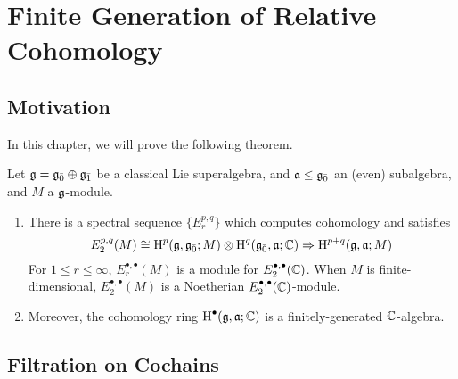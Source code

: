 \chapter{Finite Generation of Relative Cohomology}
\label{ch:finite-generation}


\section{Motivation}

In this chapter, we will prove the following theorem.

\begin{theorem}
  \label{thm:fg}
  Let $\mathfrak{g} = {\mathfrak{g}}_{\bar{0}} \oplus {\mathfrak{g}}_{\bar{1}}$ be a classical Lie superalgebra, and $\mathfrak{a} \leq {\mathfrak{g}}_{\bar{0}}$ an (even) subalgebra, and $M$ a $\mathfrak{g}$-module.
  \begin{enumerate}[\indent\rm (a)]
    \item There is a spectral sequence $\{E_r^{p,q}\}$ which computes cohomology and satisfies
  \[
    E_2^{p,q}(M) \cong \operatorname{H}^p(\mathfrak{g},{\mathfrak{g}}_{\bar{0}};M) \otimes \operatorname{H}^q({\mathfrak{g}}_{\bar{0}},\mathfrak{a};\mathbb{C}) \Rightarrow \operatorname{H}^{p+q}(\mathfrak{g},\mathfrak{a};M)
  \]
  For $1 \leq r \leq \infty$, $E_r^{\bullet,\bullet}(M)$ is a module for $E_2^{\bullet,\bullet}(\mathbb{C})$. When $M$ is finite-dimensional, $E_2^{\bullet,\bullet}(M)$ is a Noetherian $E_2^{\bullet,\bullet}(\mathbb{C})$-module.
    \item Moreover, the cohomology ring $\operatorname{H}^\bullet(\mathfrak{g},\mathfrak{a};\mathbb{C})$ is a finitely-generated $\mathbb{C}$-algebra.
  \end{enumerate}
\end{theorem}

\section{Filtration on Cochains}
\label{sec:filt-cochains}

